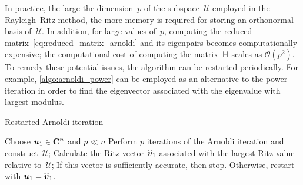 In practice, the large the dimension~$p$ of the subspace~$\mathcal U$ employed in the Rayleigh--Ritz method,
the more memory is required for storing an orthonormal basis of~$\mathcal U$.
In addition, for large values of~$p$,
computing the reduced matrix~\eqref{eq:reduced_matrix_arnoldi} and its eigenpairs becomes computationally expensive;
the computational cost of computing the matrix~$\mathsf H$ scales as $\mathcal O(p^2)$.
To remedy these potential issues,
the algorithm can be restarted periodically.
For example, \cref{algo:arnoldi_power} can be employed as an alternative to the power iteration
in order to find the eigenvector associated with the eigenvalue with largest modulus.

\begin{algorithm}
\caption{Restarted Arnoldi iteration}%
\label{algo:arnoldi_power}%
\begin{algorithmic}
\State Choose $\mathbf{\boldsymbol{u}}_1 \in \mathbf C^n$ and $p \ll n$
    \State Perform $p$ iterations of the Arnoldi iteration and construct~$\mathcal U$;
    \State Calculate the Ritz vector $\widehat {\mathbf{\boldsymbol{v}}}_1$ associated with the largest Ritz value relative to~$\mathcal U$;
    \State If this vector is sufficiently accurate, then stop. Otherwise, restart with $\mathbf{\boldsymbol{u}}_1 = \widehat {\mathbf{\boldsymbol{v}}}_1$.
\EndFor
\end{algorithmic}
\end{algorithm}

